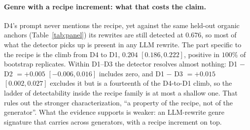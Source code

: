 \paragraph{Genre with a recipe increment: what that costs the claim.}D4's prompt never mentions the recipe, yet against the same held-out organic anchors (Table~\ref{tab:panel}) its rewrites are still detected at $0.676$, so most of what the detector picks up is present in any LLM rewrite. The part specific to the recipe is the climb from D4 to D1, $0.204$ $[0.186, 0.222]$, positive in $100\%$ of bootstrap replicates. Within D1--D3 the detector resolves almost nothing: D1 $-$ D2 $= +0.005$ $[-0.006, 0.016]$ includes zero, and D1 $-$ D3 $= +0.015$ $[0.002, 0.027]$ excludes it but is a fourteenth of the D4-to-D1 climb, so the ladder of detectability inside the recipe family is at most a shallow one. That rules out the stronger characterization, ``a property of the recipe, not of the generator''. What the evidence supports is weaker: an LLM-rewrite genre signature that carries across generators, with a recipe increment on top.

